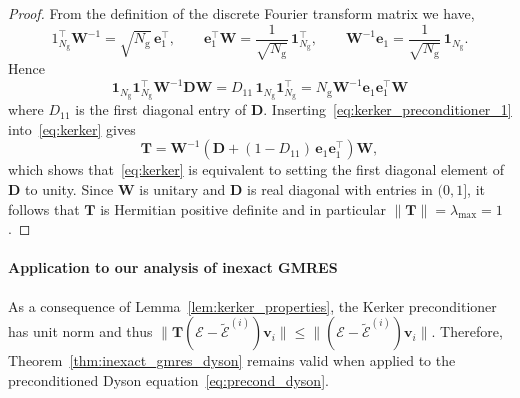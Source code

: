 \documentclass[hidelinks,onefignum,onetabnum]{siamart250211}
\newcommand{\Ng}{N_{\mathrm{g}}}
\begin{document}
\begin{proof}
From the definition of the discrete Fourier transform matrix we have,
\[
1_{\Ng}^\top \bm W^{-1} = \sqrt{\Ng}\, \bm e_1^\top,\qquad
\bm e_1^\top \bm W = \frac{1}{\sqrt{\Ng}}\, \bm 1_{\Ng}^\top,\qquad
\bm W^{-1} \bm e_1 = \frac{1}{\sqrt{\Ng}}\, \bm 1_{\Ng}.
\]
Hence
\begin{equation}\label{eq:kerker_preconditioner_1}
    \bm 1_{\Ng}\bm 1_{\Ng}^\top \bm W^{-1} \bm D \bm W
    = D_{11}\, \bm 1_{\Ng}\bm 1_{\Ng}^\top = \Ng \bm W^{-1} \bm e_1 \bm e_1^{\top} \bm W
\end{equation}
where $D_{11}$ is the first diagonal entry of $\bm D$.
Inserting~\eqref{eq:kerker_preconditioner_1} into~\eqref{eq:kerker} gives
\[
    \bm T = 
    \bm W^{-1}(\bm D + (1 - D_{11})\, \bm e_1 \bm e_1^{\top}) \bm W,
\]
which shows that~\eqref{eq:kerker} is equivalent to setting
the first diagonal element of $\bm D$ to unity.
Since $\bm W$ is unitary and $\bm D$ is real diagonal with
entries in $(0,1]$, it follows that $\bm T$ is Hermitian positive definite
and in particular $\|\bm T\|=\lambda_{\max}=1$.
\end{proof}

\paragraph{Application to our analysis of inexact GMRES}
As a consequence of Lemma~\ref{lem:kerker_properties},
the Kerker preconditioner has unit norm and thus
$\|\bm T (\bm{\mathcal E} - \widetilde{\bm{\mathcal E}}^{(i)}) \bm v_i \|
\leq \|(\bm{\mathcal E} - \widetilde{\bm{\mathcal E}}^{(i)}) \bm v_i \|.$
Therefore, Theorem~\ref{thm:inexact_gmres_dyson}
remains valid when applied to the preconditioned Dyson equation~\eqref{eq:precond_dyson}.


%
%
%
%
%
%
%
%
%
%
%
%
%
%
%
%
%
%
%
%
%
%
%
%
%
%
\end{document}
